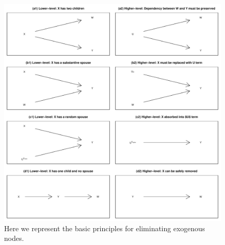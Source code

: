 \documentclass[12pt,]{book}
\begin{document}
\begin{figure}

{\centering \includegraphics[width=.5\textwidth]{ii_files/figure-latex/elimrules-1} 

}

\caption{Here we represent the basic principles for eliminating exogenous nodes.}\label{fig:elimrules}
\end{figure}
\end{document}
